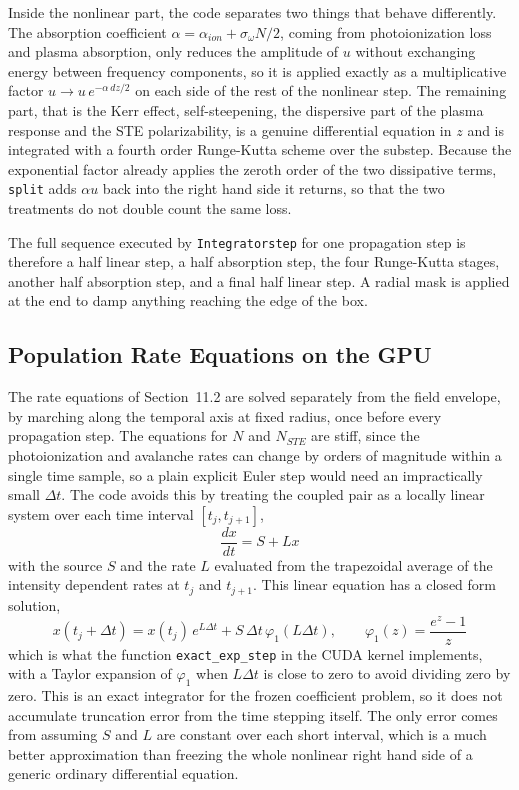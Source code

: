 Inside the nonlinear part, the code separates two things that behave differently. The absorption coefficient $\alpha=\alpha_{ion}+\sigma_\omega N/2$, coming from photoionization loss and plasma absorption, only reduces the amplitude of $u$ without exchanging energy between frequency components, so it is applied exactly as a multiplicative factor $u \to u\,e^{-\alpha\,dz/2}$ on each side of the rest of the nonlinear step. The remaining part, that is the Kerr effect, self-steepening, the dispersive part of the plasma response and the STE polarizability, is a genuine differential equation in $z$ and is integrated with a fourth order Runge-Kutta scheme over the substep. Because the exponential factor already applies the zeroth order of the two dissipative terms, \texttt{split} adds $\alpha u$ back into the right hand side it returns, so that the two treatments do not double count the same loss.

The full sequence executed by \texttt{Integrator\dotb step} for one propagation step is therefore a half linear step, a half absorption step, the four Runge-Kutta stages, another half absorption step, and a final half linear step. A radial mask is applied at the end to damp anything reaching the edge of the box.

\subsection{Population Rate Equations on the GPU}

The rate equations of Section~11.2 are solved separately from the field envelope, by marching along the temporal axis at fixed radius, once before every propagation step. The equations for $N$ and $N_{STE}$ are stiff, since the photoionization and avalanche rates can change by orders of magnitude within a single time sample, so a plain explicit Euler step would need an impractically small $\Delta t$. The code avoids this by treating the coupled pair as a locally linear system over each time interval $[t_j,t_{j+1}]$,
\begin{equation}
\frac{dx}{dt} = S + Lx
\end{equation}
with the source $S$ and the rate $L$ evaluated from the trapezoidal average of the intensity dependent rates at $t_j$ and $t_{j+1}$. This linear equation has a closed form solution,
\begin{equation}
x(t_j+\Delta t) = x(t_j)\,e^{L\Delta t} + S\,\Delta t\,\varphi_1(L\Delta t), \qquad \varphi_1(z) = \frac{e^z-1}{z}
\end{equation}
which is what the function \texttt{exact\_exp\_step} in the CUDA kernel implements, with a Taylor expansion of $\varphi_1$ when $L\Delta t$ is close to zero to avoid dividing zero by zero. This is an exact integrator for the frozen coefficient problem, so it does not accumulate truncation error from the time stepping itself. The only error comes from assuming $S$ and $L$ are constant over each short interval, which is a much better approximation than freezing the whole nonlinear right hand side of a generic ordinary differential equation.

